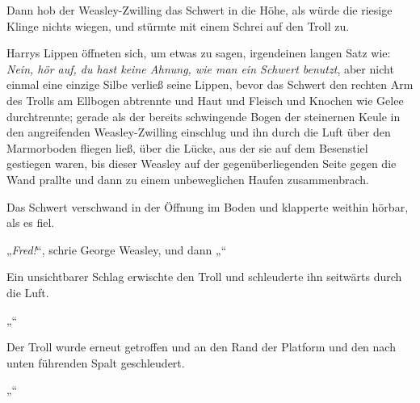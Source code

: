 Dann hob der Weasley-Zwilling das Schwert in die Höhe, als würde die riesige Klinge nichts wiegen, und stürmte mit einem Schrei auf den Troll zu.

Harrys Lippen öffneten sich, um etwas zu sagen, irgendeinen langen Satz wie: \emph{Nein, hör auf, du hast keine Ahnung, wie man ein Schwert benutzt}, aber nicht einmal eine einzige Silbe verließ seine Lippen, bevor das Schwert den rechten Arm des Trolls am Ellbogen abtrennte und Haut und Fleisch und Knochen wie Gelee durchtrennte; gerade als der bereits schwingende Bogen der steinernen Keule in den angreifenden Weasley-Zwilling einschlug und ihn durch die Luft über den Marmorboden fliegen ließ, über die Lücke, aus der sie auf dem Besenstiel gestiegen waren, bis dieser Weasley auf der gegenüberliegenden Seite gegen die Wand prallte und dann zu einem unbeweglichen Haufen zusammenbrach.

Das Schwert verschwand in der Öffnung im Boden und klapperte weithin hörbar, als es fiel.

„\emph{Fred!}“, schrie George Weasley, und dann „“

Ein unsichtbarer Schlag erwischte den Troll und schleuderte ihn seitwärts durch die Luft.

„“

Der Troll wurde erneut getroffen und an den Rand der Platform und den nach unten führenden Spalt geschleudert.

„“

